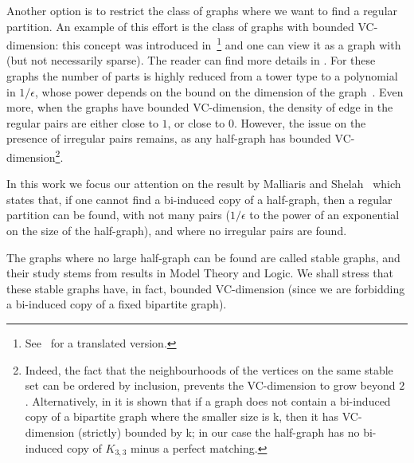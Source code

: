     Another option is to restrict the class of graphs where we want to find a regular partition.
    An example of this effort is the class of graphs with bounded VC-dimension: this concept was introduced
    in~\cite{the_uniform_convergence_of_frequencies_of_the_appearance_of_events_to_their_probabilities}\footnote{
        See~\cite{on_the_uniform_convergence_of_relative_frequencies_of_events_to_their_probabilities}
        for a translated version.}
    and one can view it as a graph with  (but not necessarily sparse).
    The reader can find more details in .
    For these graphs the number of parts is highly reduced from a tower type to a polynomial in $1/\epsilon$, whose
    power depends on the bound on the dimension of the graph~\cite{regularity_partitions_and_the_topology_of_graphons,
        erdos_hajnal_conjecture_for_graphs_with_bounded_vc_dimension,
        efficient_testing_of_bipartite_graphs_for_forbidden_induced_subgraphs}.
    Even more, when the graphs have bounded VC-dimension, the density of edge in the regular pairs are either close to $1$,
    or close to $0$.
    However, the issue on the presence of irregular pairs remains, as any half-graph has bounded VC-dimension\footnote{
        Indeed, the fact that the neighbourhoods of the vertices on the same stable set can be ordered by inclusion,
        prevents the VC-dimension to grow beyond $2$.
        Alternatively, in \cite{regularity_partitions_and_the_topology_of_graphons} it is shown that if a graph does not
        contain a bi-induced copy of a bipartite graph where the smaller size is k, then it has VC-dimension (strictly)
        bounded by k; in our case the half-graph has no bi-induced copy of $K_{3,3}$ minus a perfect matching.}.

    In this work we focus our attention on the result by Malliaris and Shelah~\cite{regularity_lemmas_for_stable_graphs,
        notes_on_the_stable_regularity_lemma}
    which states that, if one cannot find a bi-induced copy of a half-graph, then a regular partition can be found, with
    not many pairs ($1/\epsilon$ to the power of an exponential on the size of the half-graph), and where no irregular
    pairs are found.

    The graphs where no large half-graph can be found are called stable graphs, and their study stems from results in
    Model Theory and Logic.
    We shall stress that these stable graphs have, in fact, bounded VC-dimension (since we are forbidding a bi-induced
    copy of a fixed bipartite graph).

